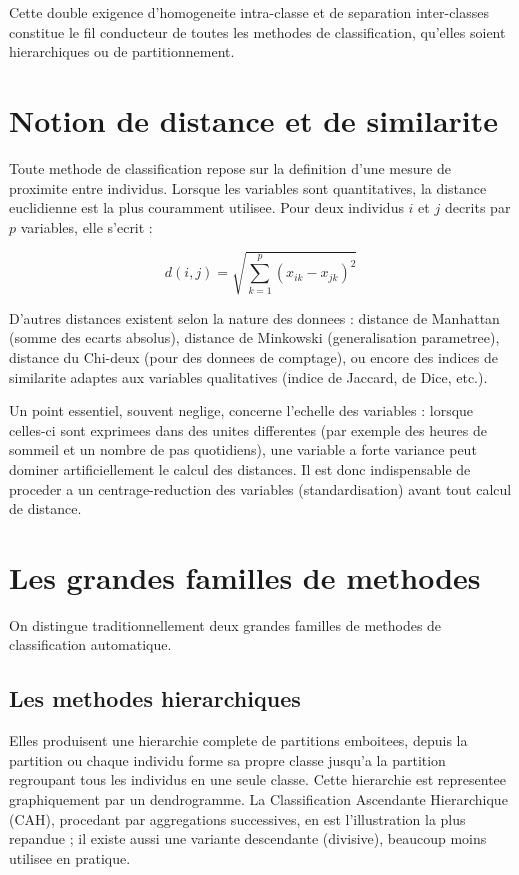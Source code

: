 \documentclass[12pt,a4paper]{book}
\begin{document}
	Cette double exigence d'homogeneite intra-classe et de separation inter-classes constitue le fil conducteur de toutes les methodes de classification, qu'elles soient hierarchiques ou de partitionnement.
	
	\section{Notion de distance et de similarite}
	
	Toute methode de classification repose sur la definition d'une mesure de proximite entre individus. Lorsque les variables sont quantitatives, la distance euclidienne est la plus couramment utilisee. Pour deux individus $i$ et $j$ decrits par $p$ variables, elle s'ecrit :
	
	\[
	d(i,j) = \sqrt{\sum_{k=1}^{p} (x_{ik} - x_{jk})^2}
	\]
	
	D'autres distances existent selon la nature des donnees : distance de Manhattan (somme des ecarts absolus), distance de Minkowski (generalisation parametree), distance du Chi-deux (pour des donnees de comptage), ou encore des indices de similarite adaptes aux variables qualitatives (indice de Jaccard, de Dice, etc.).
	
	Un point essentiel, souvent neglige, concerne l'echelle des variables : lorsque celles-ci sont exprimees dans des unites differentes (par exemple des heures de sommeil et un nombre de pas quotidiens), une variable a forte variance peut dominer artificiellement le calcul des distances. Il est donc indispensable de proceder a un centrage-reduction des variables (standardisation) avant tout calcul de distance.
	
	\section{Les grandes familles de methodes}
	
	On distingue traditionnellement deux grandes familles de methodes de classification automatique.
	
	\subsection{Les methodes hierarchiques}
	
	Elles produisent une hierarchie complete de partitions emboitees, depuis la partition ou chaque individu forme sa propre classe jusqu'a la partition regroupant tous les individus en une seule classe. Cette hierarchie est representee graphiquement par un dendrogramme. La Classification Ascendante Hierarchique (CAH), procedant par aggregations successives, en est l'illustration la plus repandue ; il existe aussi une variante descendante (divisive), beaucoup moins utilisee en pratique.
	
\end{document}
